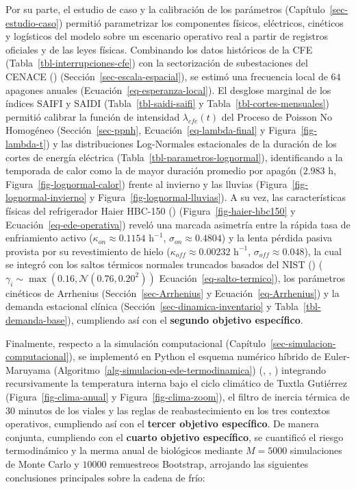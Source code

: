 \documentclass[
  spanish,
  us-letterpaper,
]{scrreprt}
\numberwithin{equation}{section}
\theoremstyle{plain}
\theoremstyle{plain}
\theoremstyle{definition}
\theoremstyle{plain}
\theoremstyle{remark}
\begin{document}
Por su parte, el estudio de caso y la calibración de los parámetros
(Capítulo~\ref{sec-estudio-caso}) permitió parametrizar los componentes
físicos, eléctricos, cinéticos y logísticos del modelo sobre un
escenario operativo real a partir de registros oficiales y de las leyes
físicas. Combinando los datos históricos de la CFE
(Tabla~\ref{tbl-interrupciones-cfe}) con la sectorización de
subestaciones del CENACE () (Sección~\ref{sec-escala-espacial}), se estimó una
frecuencia local de \(64\) apagones anuales
(Ecuación~\ref{eq-esperanza-local}). El desglose marginal de los índices
SAIFI y SAIDI (Tabla~\ref{tbl-saidi-saifi} y
Tabla~\ref{tbl-cortes-mensuales}) permitió calibrar la función de
intensidad \(\lambda_{cfe}(t)\) del Proceso de Poisson No Homogéneo
(Sección~\ref{sec-ppnh}, Ecuación~\ref{eq-lambda-final} y
Figura~\ref{fig-lambda-t}) y las distribuciones Log-Normales
estacionales de la duración de los cortes de energía eléctrica
(Tabla~\ref{tbl-parametros-lognormal}), identificando a la temporada de
calor como la de mayor duración promedio por apagón (\(2.983\text{ h}\),
Figura~\ref{fig-lognormal-calor}) frente al invierno y las lluvias
(Figura~\ref{fig-lognormal-invierno} y
Figura~\ref{fig-lognormal-lluvias}). A su vez, las características
físicas del refrigerador Haier HBC-150
()
(Figura~\ref{fig-haier-hbc150} y Ecuación~\ref{eq-ede-operativa}) reveló
una marcada asimetría entre la rápida tasa de enfriamiento activo
(\(\kappa_{on} \approx 0.1154\text{ h}^{-1}\),
\(\sigma_{on} \approx 0.4804\)) y la lenta pérdida pasiva provista por
su revestimiento de hielo
(\(\kappa_{off} \approx 0.00232\text{ h}^{-1}\),
\(\sigma_{off} \approx 0.048\)), la cual se integró con los saltos
térmicos normales truncados basados del NIST
()
(\(\gamma_i \sim \max(0.16, \mathcal{N}(0.76, 0.20^2))\)
Ecuación~\ref{eq-salto-termico}), los parámetros cinéticos de Arrhenius
(Sección~\ref{sec-Arrhenius} y Ecuación~\ref{eq-Arrhenius}) y la demanda
estacional clínica (Sección~\ref{sec-dinamica-inventario} y
Tabla~\ref{tbl-demanda-base}), cumpliendo así con el \textbf{segundo
objetivo específico}.

Finalmente, respecto a la simulación computacional
(Capítulo~\ref{sec-simulacion-computacional}), se implementó en Python
el esquema numérico híbrido de Euler-Maruyama
(Algoritmo~\ref{alg-simulacion-ede-termodinamica})
(,
,
) integrando recursivamente la
temperatura interna bajo el ciclo climático de Tuxtla Gutiérrez
(Figura~\ref{fig-clima-anual} y Figura~\ref{fig-clima-zoom}), el filtro
de inercia térmica de \(30\text{ minutos}\) de los viales y las reglas
de reabastecimiento en los tres contextos operativos, cumpliendo así con
el \textbf{tercer objetivo específico}. De manera conjunta, cumpliendo
con el \textbf{cuarto objetivo específico}, se cuantificó el riesgo
termodinámico y la merma anual de biológicos mediante \(M = 5000\)
simulaciones de Monte Carlo y \(10000\) remuestreos Bootstrap, arrojando
las siguientes conclusiones principales sobre la cadena de frío:
\end{document}
